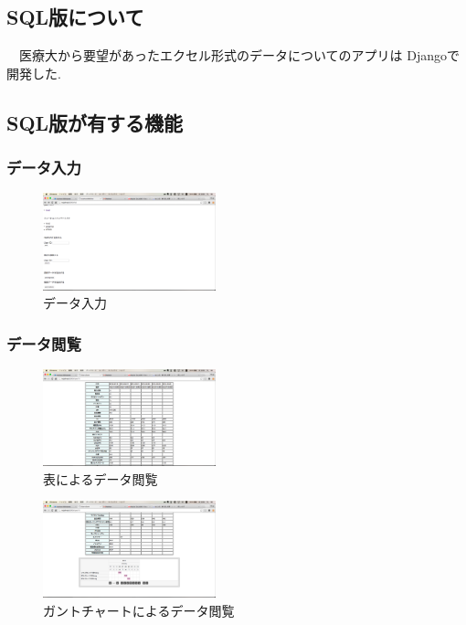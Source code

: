 \subsection{SQL版について}
　医療大から要望があったエクセル形式のデータについてのアプリは
  Djangoで開発した.

\subsection{SQL版が有する機能}
  \subsubsection{データ入力}
    \begin{figure}[htbp]
  		\begin{center}
  			\includegraphics[width=5cm, bb=0 0 645 790]{./gazou/DjangoFileio.png} %
  		\end{center}
  		\caption{データ入力}
  		\label{DjangoFileio}
  	\end{figure}

  \subsubsection{データ閲覧}
    \begin{figure}[htbp]
      \begin{center}
        \includegraphics[width=5cm, bb=0 0 645 790]{./gazou/DjangoTable.png} %
      \end{center}
      \caption{表によるデータ閲覧}
      \label{DjangoTable}
    \end{figure}

    \begin{figure}[htbp]
      \begin{center}
        \includegraphics[width=5cm, bb=0 0 645 790]{./gazou/DjangoGantt.png} %
      \end{center}
      \caption{ガントチャートによるデータ閲覧}
      \label{DjangoGantt}
    \end{figure}

